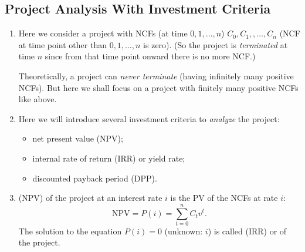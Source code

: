 \subsection{Project Analysis With Investment Criteria}
\label{subsect:project-analysis}
\begin{enumerate}
\item Here we consider a project with NCFs (at time \(0,1,\dotsc,n\))
\(C_0,C_1,,\dotsc,C_n\) (NCF at time point other than \(0,1,\dotsc,n\) is
zero). (So the project is \emph{terminated} at time \(n\) since from that time
point onward there is no more NCF.)

\begin{note}
Theoretically, a project can \emph{never terminate} (having infinitely many
positive NCFs). But here we shall focus on a project with finitely many
positive NCFs like above.
\end{note}
\item Here we will introduce several investment criteria to \emph{analyze} the
project:
\begin{itemize}
\item net present value (NPV);
\item internal rate of return (IRR) or yield rate;
\item discounted payback period (DPP).
\end{itemize}
\item {} (NPV) of the project at an interest rate \(i\)
is the PV of the NCFs at rate \(i\):
\[
\text{NPV}=P(i)=\sum_{t=0}^{n}C_tv^t.
\]
The solution to the equation \(P(i)=0\) (unknown: \(i\)) is called
 (IRR) or  of the project.


\end{enumerate}
